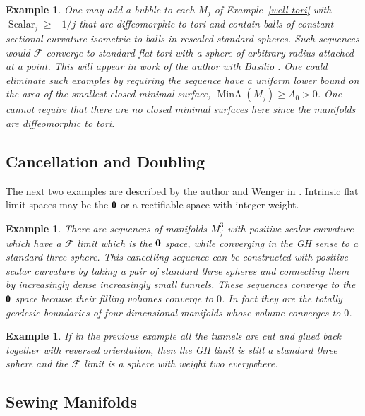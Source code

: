 \documentclass[12pt]{amsart}
\newtheorem{example}[thm]{Example}
\begin{document}
\begin{example} \label{tunnel-tori}
One may add a bubble to each $M_j$ 
of Example~\ref{well-tori} with ${\operatorname{Scalar}}_j \ge -1/j$ that are diffeomorphic
to tori and contain balls of constant sectional curvature isometric to
balls in rescaled standard spheres.  Such sequences would $\mathcal{F}$
converge to standard flat tori with a sphere of arbitrary radius
attached at a point.   
This will appear in work of the
author with Basilio \cite{Basilio-Sormani-1}.
One could eliminate such examples
by requiring the sequence have a uniform lower bound on
the area of the smallest closed minimal surface, ${\operatorname{MinA}}(M_j)\ge A_0>0$.   One cannot require 
that there are no closed minimal surfaces here since the
manifolds are diffeomorphic to tori.  
\end{example}

\subsection{Cancellation and Doubling}

The next two examples are described by the author and Wenger
in \cite{SorWen1} \cite{SorWen2}.   Intrinsic flat limit spaces may be
the ${\bf{0}}$ or a rectifiable space with integer weight.
 
\begin{example}\label{cancelling-spheres}
There are sequences of manifolds $M_j^3$ with positive scalar curvature
which have a $\mathcal{F}$ limit which is the
${\bf{0}}$ space,
while converging in the GH sense to a standard three sphere.  This cancelling 
sequence can be constructed with positive scalar
curvature by taking a pair of standard three spheres and connecting them by 
increasingly dense increasingly small tunnels.  These sequences
converge to the ${\bf{0}}$ space because their filling volumes converge to $0$. 
In fact they are the totally geodesic boundaries of four dimensional manifolds whose volume converges to $0$.
\end{example}

\begin{example}
If in the previous example all the tunnels are cut and glued back together with
reversed orientation, then the 
GH limit is still a standard three sphere and
the $\mathcal{F}$ limit is a sphere with weight two everywhere.
\end{example}

\subsection{Sewing Manifolds}
\end{document}
